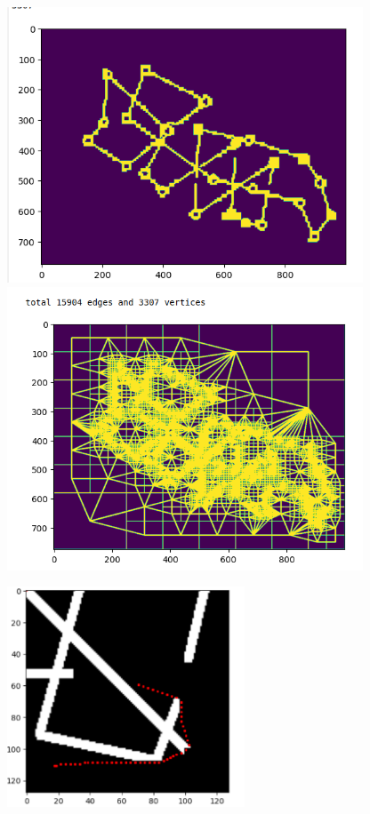 \documentclass[a4paper,12pt]{extarticle}
\begin{document}
\begin{figure}[H]
    \centering
    \includegraphics[width=300pt]{quadtree_circuit.png}
    \includegraphics[width=300pt]{quadtree_graph.png}
    \label{fig:quadtree}
\end{figure}
\begin{figure}[H]
    \centering
    \includegraphics[width=200pt]{astar.png}
    \label{fig:astar}
\end{figure}
\end{document}
